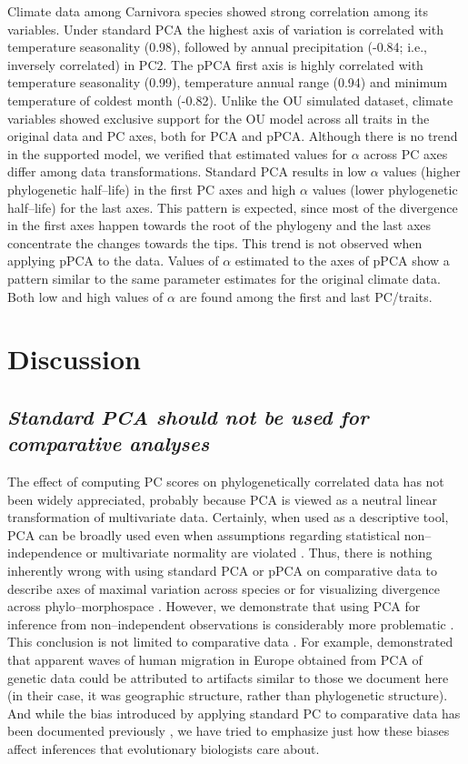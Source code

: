 \documentclass[a4paper,12pt]{article}
\begin{document}
Climate data among Carnivora species showed strong correlation among its variables. Under standard PCA the highest axis of variation is correlated with temperature seasonality (0.98), followed by annual precipitation (-0.84; i.e., inversely correlated) in PC$2$. The pPCA first axis is highly correlated with temperature seasonality (0.99), temperature annual range (0.94) and minimum temperature of coldest month (-0.82). Unlike the OU simulated dataset, climate variables showed exclusive support for the OU model across all traits in the original data and PC axes, both for PCA and pPCA. Although there is no trend in the supported model, we verified that estimated values for $\alpha$ across PC axes differ among data transformations. Standard PCA results in low $\alpha$ values (higher phylogenetic half--life) in the first PC axes and high $\alpha$ values (lower phylogenetic half--life) for the last axes. This pattern is expected, since most of the divergence in the first axes happen towards the root of the phylogeny and the last axes concentrate the changes towards the tips. This trend is not observed when applying pPCA to the data. Values of $\alpha$ estimated to the axes of pPCA show a pattern similar to the same parameter estimates for the original climate data. Both low and high values of $\alpha$ are found among the first and last PC/traits.

\section{Discussion}
\subsection{\emph{Standard PCA should not be used for comparative analyses}} 

The effect of computing PC scores on phylogenetically correlated data has not been widely appreciated, probably because PCA is viewed as a neutral linear transformation of multivariate data. Certainly, when used as a descriptive tool, PCA can be broadly used even when assumptions regarding statistical non--independence or multivariate normality are violated \citep{Jolliffe2002}. Thus, there is nothing inherently wrong with using standard PCA or pPCA on comparative data to describe axes of maximal variation across species or for visualizing divergence across phylo--morphospace \citep{Sidlauskas2008}. However, we demonstrate that using PCA for inference from non--independent observations is considerably more problematic \citep{Jolliffe2002}. This conclusion is not limited to comparative data \citep[see][]{Richman1986, Podani2002, Novembre, Bookstein2012}. For example, \citet{Novembre} demonstrated that apparent waves of human migration in Europe obtained from PCA of genetic data \citep[e.g.,][]{Cavalli} could be attributed to artifacts similar to those we document here (in their case, it was geographic structure, rather than phylogenetic structure). And while the bias introduced by applying standard PC to comparative data has been documented previously \citep{Revell2008, Polly2013}, we have tried to emphasize just how these biases affect inferences that evolutionary biologists care about.
\end{document}
